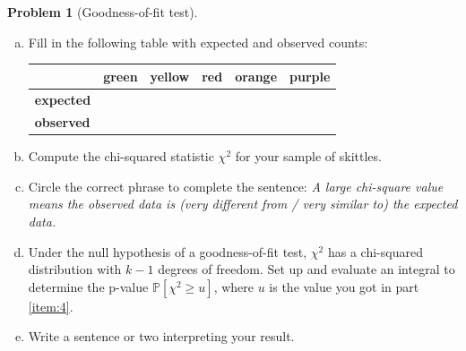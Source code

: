 \documentclass[10pt]{amsart}
\theoremstyle{definition}
\newtheorem{problem}[theorem]{Problem}
\newcommand{\1}[1]{\textbf{1}_{\left[#1\right]}} %
\def\P{\mathbb{P}} %
\begin{document}
\begin{problem}[Goodness-of-fit test]
\begin{enumerate}[(a)]
    \item Fill in the following table with expected and observed counts:
    \begin{center}
      \begin{tabular}{l|l|l|l|l|l|}
        & \textbf{green} & \textbf{yellow} & \textbf{  red  } & \textbf{orange} & \textbf{purple} \\ \hline
        \textbf{expected} &  $\phantom{\displaystyle\int}$ &   &       &   &   \\ \hline
        \textbf{observed} &  $\phantom{\displaystyle\int}$ &   &       &   &   \\ \hline
      \end{tabular}
    \end{center}
    \item Compute the chi-squared statistic $\chi^{2}$ for your sample of
    skittles. \label{item:4}
    \vspace{8cm}
    \item Circle the correct phrase to complete the sentence: \textit{A large
      chi-square value means the observed data is (very different from / very
      similar to) the expected data.}
    \item Under the null hypothesis of a goodness-of-fit test, $\chi^{2}$ has
    a chi-squared distribution with $k-1$ degrees of freedom. Set up and
    evaluate an integral to determine the p-value
    $\P\left[\chi^{2}\geq u\right]$, where $u$ is the value you got in part
    \ref{item:4}.
    \vspace{8cm}
    \item Write a sentence or two interpreting your result.
  \end{enumerate}
\end{problem}


\end{document}
